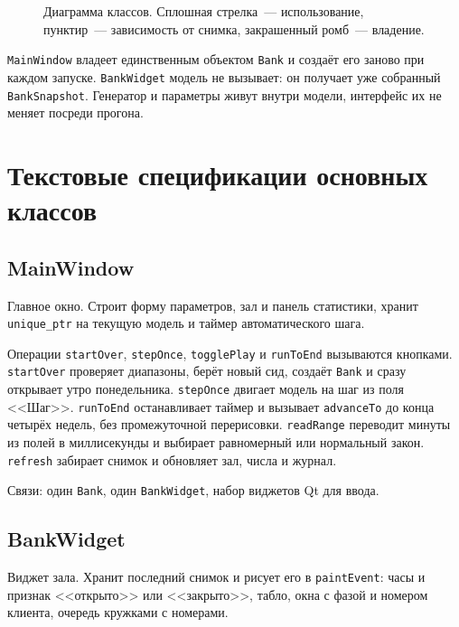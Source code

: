 \documentclass[a4paper,12pt]{article}
\begin{document}
\begin{figure}[H]
\caption{Диаграмма классов. Сплошная стрелка~--- использование, пунктир~--- зависимость от снимка, закрашенный ромб~--- владение.}
\label{fig:classes}
\end{figure}

\texttt{MainWindow} владеет единственным объектом \texttt{Bank} и создаёт его заново при каждом запуске. \texttt{BankWidget} модель не вызывает: он получает уже собранный \texttt{BankSnapshot}. Генератор и параметры живут внутри модели, интерфейс их не меняет посреди прогона.

\section{Текстовые спецификации основных классов}

\subsection*{MainWindow}
Главное окно. Строит форму параметров, зал и панель статистики, хранит \texttt{unique\_ptr} на текущую модель и таймер автоматического шага.

Операции \texttt{startOver}, \texttt{stepOnce}, \texttt{togglePlay} и \texttt{runToEnd} вызываются кнопками. \texttt{startOver} проверяет диапазоны, берёт новый сид, создаёт \texttt{Bank} и сразу открывает утро понедельника. \texttt{stepOnce} двигает модель на шаг из поля <<Шаг>>. \texttt{runToEnd} останавливает таймер и вызывает \texttt{advanceTo} до конца четырёх недель, без промежуточной перерисовки. \texttt{readRange} переводит минуты из полей в миллисекунды и выбирает равномерный или нормальный закон. \texttt{refresh} забирает снимок и обновляет зал, числа и журнал.

Связи: один \texttt{Bank}, один \texttt{BankWidget}, набор виджетов Qt для ввода.

\subsection*{BankWidget}
Виджет зала. Хранит последний снимок и рисует его в \texttt{paintEvent}: часы и признак <<открыто>> или <<закрыто>>, табло, окна с фазой и номером клиента, очередь кружками с номерами.
\end{document}
